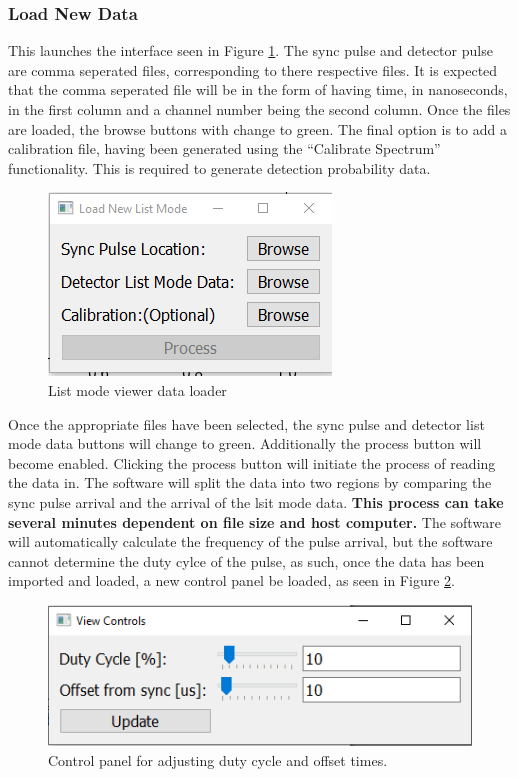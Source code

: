 \subsubsection{Load New Data}
This launches the interface seen in Figure \ref{fig:new_loader}. The sync pulse and detector pulse are comma seperated files, corresponding to there respective files. It is expected that the comma seperated file will be in the form of having time, in nanoseconds, in the first column and a channel number being the second column. Once the files are loaded, the browse buttons with change to green. The final option is to add a calibration file, having been generated using the ``Calibrate Spectrum'' functionality. This is required to generate detection probability data.\\
\begin{figure}[h!]
	\centering
	\includegraphics[width=0.5\linewidth]{load_new_viewer.png}
	\caption{List mode viewer data loader}
	\label{fig:new_loader}
\end{figure}

Once the appropriate files have been selected, the sync pulse and detector list mode data buttons will change to green. Additionally the process button will become enabled. Clicking the process button will initiate the process of reading the data in. The software will split the data into two regions by comparing the sync pulse arrival and the arrival of the lsit mode data. \textbf{This process can take several minutes dependent on file size and host computer.} The software will automatically calculate the frequency of the pulse arrival, but the software cannot determine the duty cylce of the pulse, as such, once the data has been imported and loaded, a new control panel be loaded, as seen in Figure \ref{fig:adjust_controls}. 

\begin{figure}[h!]
	\centering
	\includegraphics[width=0.5\linewidth]{control_panel.png}
	\caption{Control panel for adjusting duty cycle and offset times.}
	\label{fig:adjust_controls}
\end{figure}

